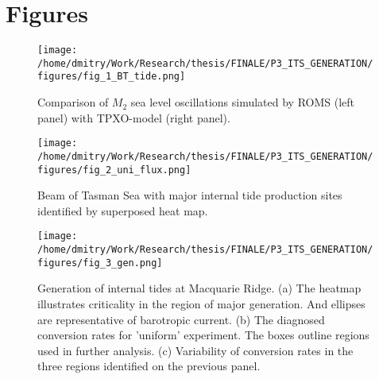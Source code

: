 \documentclass[12pt]{article}
\begin{document}

\newpage
\section{Figures}

\begin{figure}
	\centering
	\texttt{[image: /home/dmitry/Work/Research/thesis/FINALE/P3\_ITS\_GENERATION/figures/fig\_1\_BT\_tide.png]}
	\caption{Comparison of $M_2$ sea level oscillations simulated by ROMS (left panel) with 
	TPXO-model (right panel).}
	\label{C3.fig:BT}
\end{figure}

\begin{figure}
	\centering
	\texttt{[image: /home/dmitry/Work/Research/thesis/FINALE/P3\_ITS\_GENERATION/figures/fig\_2\_uni\_flux.png]}
	\caption{Beam of Tasman Sea with major internal tide production sites identified by superposed 
	heat map.}
	\label{C3.fig:beam}
\end{figure}

\begin{figure}
	\centering
	\texttt{[image: /home/dmitry/Work/Research/thesis/FINALE/P3\_ITS\_GENERATION/figures/fig\_3\_gen.png]}
	\caption{Generation of internal tides at Macquarie Ridge. (a) The heatmap illustrates 
	criticality in the region of major generation. And ellipses are representative of barotropic 
	current. (b) The diagnosed conversion rates for 'uniform' experiment. The boxes outline regions 
	used in further analysis. (c) Variability of conversion rates in the three regions identified 
	on the previous panel.}
	\label{C3.fig:gen}
\end{figure}
\end{document}

